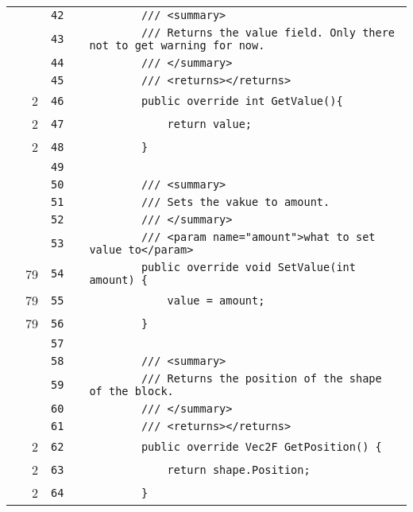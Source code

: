 \documentclass[a4paper,landscape,10pt]{article}
\begin{document}
\begin{longtable}[l]{lrrll}
\cellcolor{gray} &  & \verb~42~ & & \verb~        /// <summary>~\\
\cellcolor{gray} &  & \verb~43~ & & \verb~        /// Returns the value field. Only there not to get warning for now.~\\
\cellcolor{gray} &  & \verb~44~ & & \verb~        /// </summary>~\\
\cellcolor{gray} &  & \verb~45~ & & \verb~        /// <returns></returns>~\\
\cellcolor{green} & 2 & \verb~46~ & & \verb~        public override int GetValue(){~\\
\cellcolor{green} & 2 & \verb~47~ & & \verb~            return value;~\\
\cellcolor{green} & 2 & \verb~48~ & & \verb~        }~\\
\cellcolor{gray} &  & \verb~49~ & & \verb~~\\
\cellcolor{gray} &  & \verb~50~ & & \verb~        /// <summary>~\\
\cellcolor{gray} &  & \verb~51~ & & \verb~        /// Sets the vakue to amount.~\\
\cellcolor{gray} &  & \verb~52~ & & \verb~        /// </summary>~\\
\cellcolor{gray} &  & \verb~53~ & & \verb~        /// <param name="amount">what to set value to</param>~\\
\cellcolor{green} & 79 & \verb~54~ & & \verb~        public override void SetValue(int amount) {~\\
\cellcolor{green} & 79 & \verb~55~ & & \verb~            value = amount;~\\
\cellcolor{green} & 79 & \verb~56~ & & \verb~        }~\\
\cellcolor{gray} &  & \verb~57~ & & \verb~~\\
\cellcolor{gray} &  & \verb~58~ & & \verb~        /// <summary>~\\
\cellcolor{gray} &  & \verb~59~ & & \verb~        /// Returns the position of the shape of the block.~\\
\cellcolor{gray} &  & \verb~60~ & & \verb~        /// </summary>~\\
\cellcolor{gray} &  & \verb~61~ & & \verb~        /// <returns></returns>~\\
\cellcolor{green} & 2 & \verb~62~ & & \verb~        public override Vec2F GetPosition() {~\\
\cellcolor{green} & 2 & \verb~63~ & & \verb~            return shape.Position;~\\
\cellcolor{green} & 2 & \verb~64~ & & \verb~        }~\\

\end{longtable}
\end{document}
